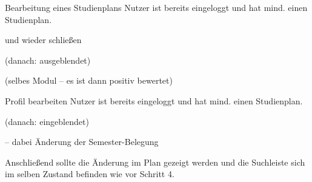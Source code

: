 \begin{scenario*}{Bearbeitung eines Studienplans}
	{Nutzer ist bereits eingeloggt und hat mind. einen Studienplan.}
	\item {}
	\item {} 
	\item {} und wieder schließen
	\item {}
	\item {}
	\item {} 
	\item {} (danach: ausgeblendet)
	\item {}
	\item {}
	\item {}
	\item {} (selbes \gls{Modul} – es ist dann positiv bewertet) 
	\item {}
	\item {}
	\item {}
\end{scenario*}

\begin{scenario*}{Profil bearbeiten}
	{Nutzer ist bereits eingeloggt und hat mind. einen Studienplan.}
	\item {}
	\item {} (danach: eingeblendet)
	\item {}
	\item {} – dabei Änderung der Semester-Belegung
	\item Anschließend sollte die Änderung im Plan gezeigt werden und die Suchleiste sich im selben Zustand befinden wie vor Schritt 4.
\end{scenario*}

